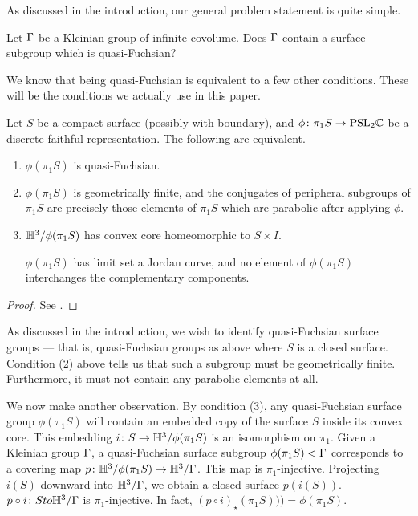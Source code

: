 As discussed in the introduction, our general problem statement is quite
simple.

\begin{prob}

Let $\Gamma$ be a Kleinian group of infinite covolume. Does $\Gamma$ contain
a surface subgroup which is quasi-Fuchsian?

\end{prob}

We know that being quasi-Fuchsian is equivalent to a few other conditions.
These will be the conditions we actually use in this paper.

\begin{prop}

Let $S$ be a compact surface (possibly with boundary), and $\phi \colon \pi_1S
\to \mathrm{PSL}_2\mathbb{C}$ be a discrete faithful representation. The following are
equivalent.

\begin{enumerate}

\item $\phi(\pi_1S)$ is quasi-Fuchsian.

\item $\phi(\pi_1S)$ is geometrically finite, and the conjugates of peripheral
subgroups of $\pi_1S$ are precisely those elements of $\pi_1S$ which are
parabolic after applying $\phi$.

\item $\mathbb{H}^3/\phi(\pi_1S)$ has convex core homeomorphic to $S \times I$.

$\phi(\pi_1S)$ has limit set a Jordan curve, and no element of $\phi(\pi_1S)$
interchanges the complementary components.

\end{enumerate}

\end{prop}

\begin{proof}

See \cite[Proposition 9.2]{Mo}.%

\end{proof}

As discussed in the introduction, we wish to identify quasi-Fuchsian surface
groups --- that is, quasi-Fuchsian groups as above where $S$ is a closed
surface.  Condition (2) above tells us that such a subgroup must be
geometrically finite.  Furthermore, it must not contain any parabolic elements
at all.

We now make another observation. By condition (3), any quasi-Fuchsian surface
group $\phi(\pi_1S)$ will contain an embedded copy of the surface $S$ inside
its convex core.  This embedding $i \colon S \to \mathbb{H}^3/\phi(\pi_1S)$ is an
isomorphism on $\pi_1$.  Given a Kleinian group $\Gamma$, a quasi-Fuchsian surface
subgroup $\phi(\pi_1S) < \Gamma$ corresponds to a covering map $p \colon
\mathbb{H}^3/\phi(\pi_1S) \to \mathbb{H}^3/\Gamma$. This map is $\pi_1$-injective.  Projecting
$i(S)$ downward into $\mathbb{H}^3/\Gamma$, we obtain a closed surface $p(i(S))$. $p
\circ i \colon S to \mathbb{H}^3/\Gamma$ is $\pi_1$-injective. In fact, $(p \circ
i)_\star(\pi_1S))) = \phi(\pi_1S)$.

